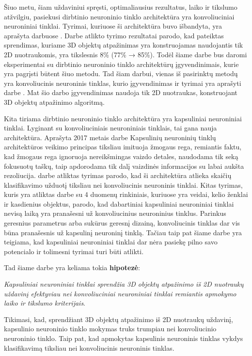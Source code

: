 Šiuo metu, šiam uždaviniui spręsti, optimaliausius  rezultatus, laiko ir tikslumo atžvilgiu, pasiekusi dirbtinio neuroninio tinklo architektūra yra konvoliuciniai neuroniniai tinklai. Tyrimai, kuriuose ši architektūra buvo išbandyta, yra aprašyta darbuose \cite{cnnExp1, cnnExp2}. Darbe \cite{dbnExp} atlikto tyrimo rezultatai parodo, kad pateiktas sprendimas, kuriame 3D objektų atpažinimas yra konstruojamas naudojantis tik 2D nuotraukomis, yra tikslesnis 8\% (77\% → 85\%). Todėl šiame darbe bus daromi eksperimentai su dirbtinio neuroninio tinklo architektūrų įgyvendinimais, kurie yra pagrįsti būtent šiuo metodu. Tad šiam darbui, vienas iš pasirinktų metodų yra konvoliucinis neuroninis tinklas, kurio įgyvendinimas ir tyrimai yra aprašyti darbe \cite{cnnExp1}. Mat šio darbo įgyvendinimas naudoja tik 2D nuotraukas, konstruojant 3D objektų atpažinimo algoritmą.

Kita tiriama dirbtinio neuroninio tinklo architektūra yra kapsuliniai neuroniniai tinklai. Lyginant su konvoliuciniais neuroniniais tinklais, tai gana nauja architektūra. Aprašyta 2017 metais darbe \cite{capsNet} Kapsulinių neuroninių tinklų architektūros veikimo principas tiksliau imituoja žmogaus rega, remiantis faktu, kad žmogaus rega ignoruoja nereikšmingas vaizdo detales, naudodama tik seką fokusuotų taškų, taip apdorodama tik dalį vaizdinės informacijos su labai aukšta rezoliucija. \cite{capsNet} darbe atliktas tyrimas parodo, kad ši architektūra atlieka skaičių klasifikavimo užduotį tiksliau nei konvoliucinis neuroninis tinklai. Kitas tyrimas, kuris yra atliktas darbe \cite{capsCNN} su 4 duomenų rinkiniais, kuriuose yra veidai, kelio ženklai ir kasdienius objektus, parodo, kad dabartiniai kapsuliniai neuroniniai tinklai nevisą laiką yra pranašesni už konvoliucinius neuroninius tinklus. Parinkus geresnius parametrus arba sukūrus geresnį dizainą, konvoliucinis tinklas dar vis būna pranašesnis už kapsulinį neuroninį tinklą. Tačiau taip pat šiame darbe yra teigiama, kad kapsuliniai neuroniniai tinklai dar nėra pasiekę pilno savo potencialo ir tolimesni tyrimai turi būti atlikti.

Tad šiame darbe yra keliama tokia \textbf{hipotezė}:

\textit{Kapsuliniai neuroniniai tinklai sprendžia 3D objektų atpažinimo iš 2D nuotraukų uždavinį efektyviau nei konvoliuciniai neuroniniai tinklai remiantis apmokymo laiko ir tikslumo kriterijais}.

Tikimasi, kad, sprendžiant 3D objektų atpažinimo iš 2D nuotraukų uždavinį, kapsulinio neuroninio tinklo mokymas truks trumpiau nei konvoliucinio neuroninio tinklo. Taip pat, kad apmokytas kapsulinis neuroninis tinklas vykdys klasifikavimą tiksliau nei konvoliucinis neuroninis tinklas.

